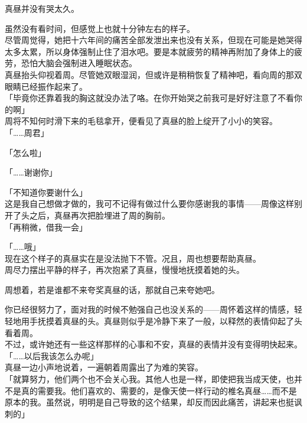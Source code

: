 真昼并没有哭太久。

虽然没有看时间，但感觉上也就十分钟左右的样子。\\

尽管周觉得，她把十六年间的痛苦全部发泄出来也没有关系，但现在可能是她哭得太多太累，所以身体强制止住了泪水吧。要是本就疲劳的精神再附加了身体上的疲劳，恐怕大脑会强制进入睡眠状态。\\

真昼抬头仰视着周。尽管她双眼湿润，但或许是稍稍恢复了精神吧，看向周的那双眼睛已经振作起来了。\\

「毕竟你还靠着我的胸这就没办法了咯。在你开始哭之前我可是好好注意了不看你的啊」\\

周将不知何时滑下来的毛毯拿开，便看见了真昼的脸上绽开了小小的笑容。\\

「……周君」

「怎么啦」

「……谢谢你」

「不知道你要谢什么」\\

这是我自己想做才做的，我可不记得有做过什么要你感谢我的事情——周像这样别开了头之后，真昼再次把脸埋进了周的胸前。\\

「再稍微，借我一会」

「……哦」\\

现在这个样子的真昼实在是没法抛下不管。况且，周也想要帮助真昼。\\

周尽力摆出平静的样子，再次抱紧了真昼，慢慢地抚摸着她的头。

周想着，若是谁都不来夸奖真昼的话，那就自己来夸她吧。

你已经很努力了，面对我的时候不勉强自己也没关系的——周怀着这样的情感，轻轻地用手抚摸着真昼的头。真昼则似乎是冷静下来了一般，以释然的表情仰起了头看着周。\\

不过，或许她还有一些这样那样的心事和不安，真昼的表情并没有变得明快起来。\\

「……以后我该怎么办呢」\\

真昼一边小声地说着，一遍朝着周露出了为难的笑容。\\

「就算努力，他们两个也不会关心我。其他人也是一样，即使把我当成天使，也并不是真的需要我。他们喜欢的、需要的，是像天使一样行动的椎名真昼……而不是原本的我。虽然说，明明是自己导致的这个结果，却反而因此痛苦，讲起来也挺讽刺的」\\

